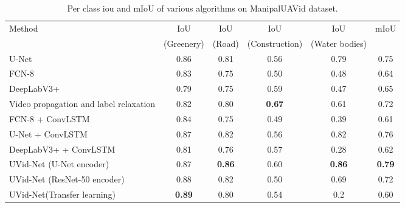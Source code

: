 \documentclass[journal]{IEEEtran}
\begin{document}
\begin{table*}[!h]
	\begin{center}
		\begin{tabular}{|l|c|c|c|c|c|}
			\hline
			Method & IoU &IoU &IoU&IoU&mIoU \\
			&(Greenery)&(Road)&(Construction)& (Water bodies)&\\
			\hline\hline
			U-Net \cite{2} &0.86	&0.81	&0.56	&0.79	&0.75	 \\
			\hline
			FCN-8 \cite{4} &0.83 &0.75&0.50	&0.48&0.64 \\
			\hline
			DeepLabV3+ \cite{33} & 0.79&0.75& 0.59&0.47	&0.65\\
			\hline
			\hline
			Video propagation and label relaxation \cite{22}  &0.82  &0.80 &\textbf{0.67}&0.61 &0.72\\
			\hline 
			FCN-8 + ConvLSTM \cite{wang2019deep}  &0.84 &0.75 &0.49&0.39 &0.61 \\
			\hline 
			U-Net + ConvLSTM &0.87 &0.82 &0.56 &0.82&0.76\\
			\hline
			DeepLabV3+ + ConvLSTM &0.81 &0.76 &0.57 &0.28 &0.62\\
			\hline
			\hline
			UVid-Net (U-Net encoder)&0.87&	\textbf{0.86}&	0.60&\textbf{0.86}&	\textbf{0.79}\\
			\hline
			UVid-Net (ResNet-50 encoder) &0.88	&0.82	&	0.50&0.69	&0.72\\
			\hline
			UVid-Net(Transfer learning) &\textbf{ 0.89}& 0.80 &0.54&0.2&0.60\\\hline
		\end{tabular}
	\end{center}
	\caption{Per class iou and mIoU of various algorithms on ManipalUAVid dataset.}
	\label{table2}
\end{table*}
\end{document}
